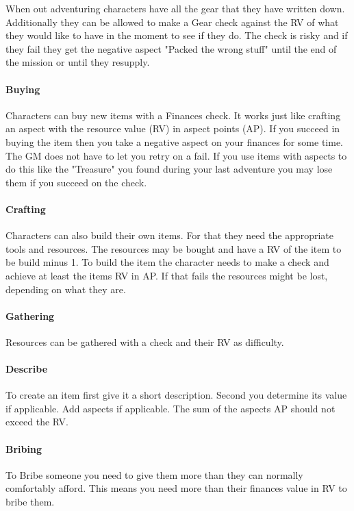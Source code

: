 \documentclass[11pt]{article}
\begin{document}
{When out adventuring characters have all the gear that they have written down. Additionally they can be allowed to make a Gear check against the RV of what they would like to have in the moment to see if they do. The check is risky and if they fail they get the negative aspect "Packed the wrong stuff" until the end of the mission or until they resupply. 

\paragraph*{Buying}
\label{sec:orga64e860}

Characters can buy new items with a Finances check. It works just like crafting an aspect with the resource value (RV) in aspect points (AP). If you succeed in buying the item then you take a negative aspect on your finances for some time. The GM does not have to let you retry on a fail. If you use items with aspects to do this like the "Treasure" you found during your last adventure you may lose them if you succeed on the check.

\paragraph*{Crafting}
\label{sec:org925220f}
Characters can also build their own items. For that they need the appropriate tools and resources. The resources may be bought and have a RV of the item to be build minus 1. To build the item the character needs to make a check and achieve at least the items RV in AP. If that fails the resources might be lost, depending on what they are.

\paragraph*{Gathering}
\label{sec:org0509887}
Resources can be gathered with a check and their RV as difficulty.

\paragraph*{Describe}
\label{sec:org646798c}
To create an item first give it a short description. Second you determine its value if applicable. Add aspects if applicable. The sum of the aspects AP should not exceed the RV.

\paragraph*{Bribing}
\label{sec:orge1d9c2e}
To Bribe someone you need to give them more than they can normally comfortably afford. This means you need more than their finances value in RV to bribe them.

}
\end{document}
